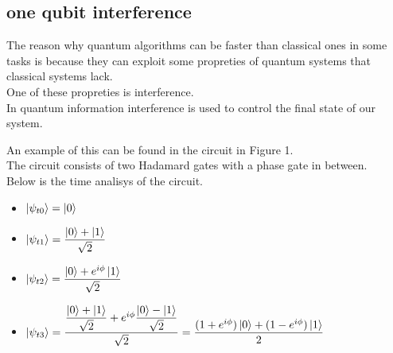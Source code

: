 \documentclass{article}
\begin{document}
\subsection{one qubit interference}




The reason why quantum algorithms can be faster than classical ones
in some tasks is because they can exploit some propreties of quantum
systems that classical systems lack.\\
One of these propreties is interference.\\
In quantum information interference is used to control the final
state of our system.\\

\newpage
\begin{center}
\end{center}
\vspace{10pt}

An example of this can be found in the circuit in Figure 1.\\
The circuit consists of two Hadamard gates with a phase gate
in between.\\
Below is the time analisys of the circuit.
\begin{itemize}

	\item $\ket{\psi_{t0}} = \ket{0}$
	\item $\ket{\psi_{t1}} = \dfrac{\ket{0}+\ket{1}}{\sqrt{2}}$
	\item $\ket{\psi_{t2}} = \dfrac{\ket{0}+e^{i\phi}\ket{1}}{\sqrt{2}}$
	\item $\ket{\psi_{t3}} = \dfrac{\dfrac{\ket{0}+\ket{1}}{\sqrt{2}}+e^{i\phi}\dfrac{\ket{0}-\ket{1}}
		      {\sqrt{2}}}{\sqrt{2}}   = \dfrac{(1+e^{i\phi})\ket{0}+(1-e^{i\phi})\ket{1}}{2}$




\end{itemize}

\vspace{20pt}
\end{document}
